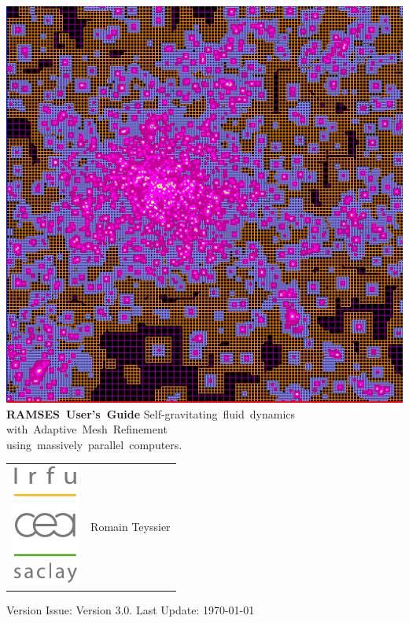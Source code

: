 \begin{titlepage}
   \flushright
   \begin{minipage}{0.6\linewidth}
      \flushright
      \includegraphics[width=\linewidth]{img/amr.png}
      \vskip 1cm
      {\huge \textbf{RAMSES~User's~Guide}}
      \vskip 2cm
      \Large
                  Self-gravitating~fluid~dynamics\\
      \vskip 5mm  with~Adaptive~Mesh~Refinement\\
      \vskip 5mm  using~massively~parallel~computers.
      \vskip 2cm

      \begin{tabular}{m{}m{}@{}}
      \includegraphics[height=4cm]{img/irfu.pdf} & {\hfill \large Romain Teyssier} 
      \end{tabular}
   \end{minipage}
   \vfill
   \dblrule
   \flushright
   Version Issue: Version 3.0. Last Update: \today
\end{titlepage}
